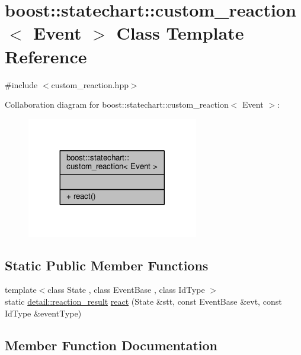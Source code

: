 \hypertarget{classboost_1_1statechart_1_1custom__reaction}{}\section{boost\+:\+:statechart\+:\+:custom\+\_\+reaction$<$ Event $>$ Class Template Reference}
\label{classboost_1_1statechart_1_1custom__reaction}


{\ttfamily \#include $<$custom\+\_\+reaction.\+hpp$>$}



Collaboration diagram for boost\+:\+:statechart\+:\+:custom\+\_\+reaction$<$ Event $>$\+:
\nopagebreak
\begin{figure}[H]
\begin{center}
\leavevmode
\includegraphics[width=212pt]{classboost_1_1statechart_1_1custom__reaction__coll__graph}
\end{center}
\end{figure}
\subsection*{Static Public Member Functions}
\begin{DoxyCompactItemize}
\item 
{\footnotesize template$<$class State , class Event\+Base , class Id\+Type $>$ }\\static \mbox{\hyperlink{namespaceboost_1_1statechart_1_1detail_ab091bbb4c29327fb46ee479ea1b7255b}{detail\+::reaction\+\_\+result}} \mbox{\hyperlink{classboost_1_1statechart_1_1custom__reaction_a1de25f5eb09b254a6acf2e7bcfc2289b}{react}} (State \&stt, const Event\+Base \&evt, const Id\+Type \&event\+Type)
\end{DoxyCompactItemize}


\subsection{Member Function Documentation}
\mbox{\label{classboost_1_1statechart_1_1custom__reaction_a1de25f5eb09b254a6acf2e7bcfc2289b}} 
